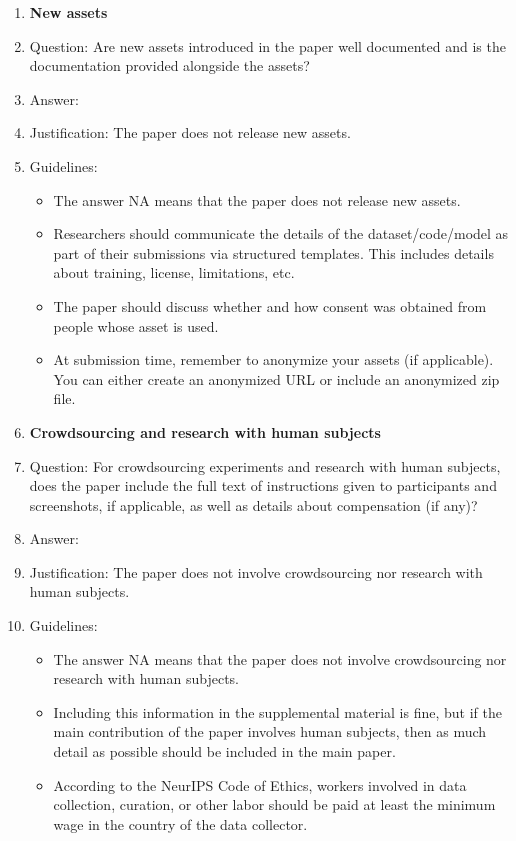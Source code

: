 \documentclass{article}
\theoremstyle{definition} \newtheorem{definition}{Definition}  \newtheorem{example}{Example}
\theoremstyle{remark} \newtheorem{remark}{Remark}
\newcounter{ct}
\begin{document}
\begin{enumerate}
\item {\bf New assets}
    \item[] Question: Are new assets introduced in the paper well documented and is the documentation provided alongside the assets?
    \item[] Answer: \answerNA{} %
    \item[] Justification: The paper does not release new assets.
    \item[] Guidelines:
    \begin{itemize}
        \item The answer NA means that the paper does not release new assets.
        \item Researchers should communicate the details of the dataset/code/model as part of their submissions via structured templates. This includes details about training, license, limitations, etc. 
        \item The paper should discuss whether and how consent was obtained from people whose asset is used.
        \item At submission time, remember to anonymize your assets (if applicable). You can either create an anonymized URL or include an anonymized zip file.
    \end{itemize}

\item {\bf Crowdsourcing and research with human subjects}
    \item[] Question: For crowdsourcing experiments and research with human subjects, does the paper include the full text of instructions given to participants and screenshots, if applicable, as well as details about compensation (if any)? 
    \item[] Answer: \answerNA{} %
    \item[] Justification: The paper does not involve crowdsourcing nor research with human subjects.
    \item[] Guidelines:
    \begin{itemize}
        \item The answer NA means that the paper does not involve crowdsourcing nor research with human subjects.
        \item Including this information in the supplemental material is fine, but if the main contribution of the paper involves human subjects, then as much detail as possible should be included in the main paper. 
        \item According to the NeurIPS Code of Ethics, workers involved in data collection, curation, or other labor should be paid at least the minimum wage in the country of the data collector. 
    \end{itemize}


\end{enumerate}
\end{document}
